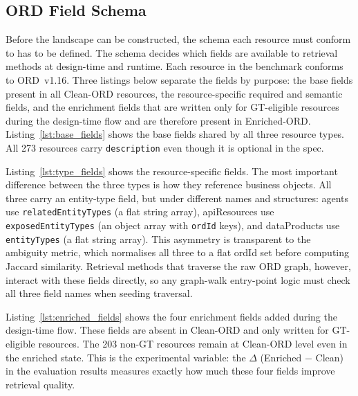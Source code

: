 \subsection{ORD Field Schema}
\label{appendix:landscape-ord-schema}

Before the landscape can be constructed, the schema each resource must conform to has to be defined. The schema decides which fields are available to retrieval methods at design-time and runtime. Each resource in the benchmark conforms to ORD~v1.16. Three listings below separate the fields by purpose: the base fields present in all Clean-ORD resources, the resource-specific required and semantic fields, and the enrichment fields that are written only for GT-eligible resources during the design-time flow and are therefore present in Enriched-ORD. Listing~\ref{lst:base_fields} shows the base fields shared by all three resource types. All 273 resources carry \texttt{description} even though it is optional in the spec.



Listing~\ref{lst:type_fields} shows the resource-specific fields. The most important difference between the three types is how they reference business objects. All three carry an entity-type field, but under different names and structures: agents use \texttt{relatedEntityTypes} (a flat string array), apiResources use \texttt{exposedEntityTypes} (an object array with \texttt{ordId} keys), and dataProducts use \texttt{entityTypes} (a flat string array). This asymmetry is transparent to the ambiguity metric, which normalises all three to a flat ordId set before computing Jaccard similarity. Retrieval methods that traverse the raw ORD graph, however, interact with these fields directly, so any graph-walk entry-point logic must check all three field names when seeding traversal.



Listing~\ref{lst:enriched_fields} shows the four enrichment fields added during the design-time flow. These fields are absent in Clean-ORD and only written for GT-eligible resources. The 203 non-GT resources remain at Clean-ORD level even in the enriched state. This is the experimental variable: the $\Delta$ (Enriched $-$ Clean) in the evaluation results measures exactly how much these four fields improve retrieval quality.

